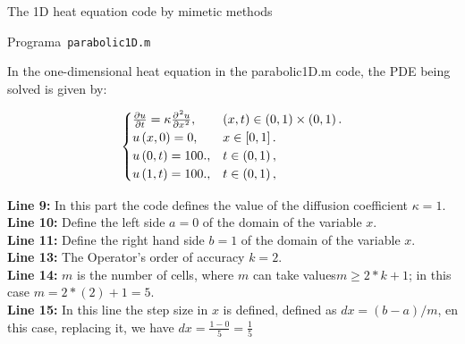 The 1D heat equation code by mimetic methods


\begin{listing}[ht!]
    \tiny
    \centering
    \caption{Programa~\texttt{parabolic1D.m}}
    \label{code:parabolic1D.m}
\end{listing}


In the one-dimensional heat equation in the parabolic1D.m code, the PDE being solved is given by:


\begin{equation}\label{eq:IBVPheat1d}
    \begin{cases}
        \diffp{u}{t}=
        \kappa\diffp[2]{u}{x},
                                 & \left(x,t\right)\in
        \left(0,1 \right)\times\left(0, 1 \right).     \\
        u\left(x,0\right)= 0,
                                 & x\in
        \left[0,1\right].                              \\
        u\left(0,t\right)= 100., & t\in
        \left(0,1 \right),                             \\
        u\left(1,t\right)= 100.,
                                 & t\in
        \left(0, 1\right),
    \end{cases}
\end{equation}


\textbf{Line 9:} In this part the code defines the value of the diffusion coefficient $\kappa =1$.\\

\textbf{Line 10:} Define the left side $a= 0$ of the domain of the variable $x$.\\

\textbf{Line 11:} Define the right hand side $b= 1$ of the domain of the variable $x$.\\

\textbf{Line 13:} The Operator's order of accuracy $k = 2$.\\

\textbf{Line 14:} $m$ is the number of cells, where $m$ can take values ​​$m \geq 2*k+1$; in this case $m=2*(2)+1=5$.\\

\textbf{Line 15:} In this line the step size in $x$ is defined, defined as $dx=(b-a)/m$, en this case, replacing it, we have $dx =\frac{1-0}{5} =\frac{1}{5}$ \\

